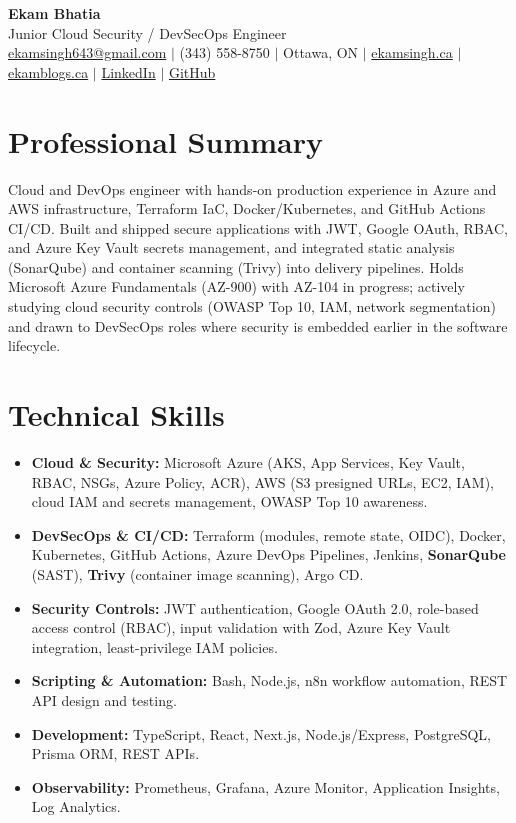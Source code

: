 \documentclass[11pt,a4paper]{article}
\begin{document}
\begin{center}
    {\LARGE \textbf{Ekam Bhatia}} \\
    \vspace{2pt}
    {\normalsize Junior Cloud Security / DevSecOps Engineer} \\
    \vspace{4pt}
    \small
    \href{mailto:ekamsingh643@gmail.com}{ekamsingh643@gmail.com} $|$
    (343) 558-8750 $|$ Ottawa, ON $|$
    \href{https://www.ekamsingh.ca}{ekamsingh.ca} $|$
    \href{https://www.ekamblogs.ca}{ekamblogs.ca} $|$
    \href{https://www.linkedin.com/in/ekam-bhatia-335840168}{LinkedIn} $|$
    \href{https://github.com/bhat0155}{GitHub}
\end{center}

\section{Professional Summary}
Cloud and DevOps engineer with hands-on production experience in Azure and AWS infrastructure, Terraform IaC, Docker/Kubernetes, and GitHub Actions CI/CD. Built and shipped secure applications with JWT, Google OAuth, RBAC, and Azure Key Vault secrets management, and integrated static analysis (SonarQube) and container scanning (Trivy) into delivery pipelines. Holds Microsoft Azure Fundamentals (AZ-900) with AZ-104 in progress; actively studying cloud security controls (OWASP Top 10, IAM, network segmentation) and drawn to DevSecOps roles where security is embedded earlier in the software lifecycle.

\section{Technical Skills}
\begin{itemize}
    \item \textbf{Cloud \& Security:} Microsoft Azure (AKS, App Services, Key Vault, RBAC, NSGs, Azure Policy, ACR), AWS (S3 presigned URLs, EC2, IAM), cloud IAM and secrets management, OWASP Top 10 awareness.
    \item \textbf{DevSecOps \& CI/CD:} Terraform (modules, remote state, OIDC), Docker, Kubernetes, GitHub Actions, Azure DevOps Pipelines, Jenkins, \textbf{SonarQube} (SAST), \textbf{Trivy} (container image scanning), Argo CD.
    \item \textbf{Security Controls:} JWT authentication, Google OAuth 2.0, role-based access control (RBAC), input validation with Zod, Azure Key Vault integration, least-privilege IAM policies.
    \item \textbf{Scripting \& Automation:} Bash, Node.js, n8n workflow automation, REST API design and testing.
    \item \textbf{Development:} TypeScript, React, Next.js, Node.js/Express, PostgreSQL, Prisma ORM, REST APIs.
    \item \textbf{Observability:} Prometheus, Grafana, Azure Monitor, Application Insights, Log Analytics.
\end{itemize}
\end{document}

